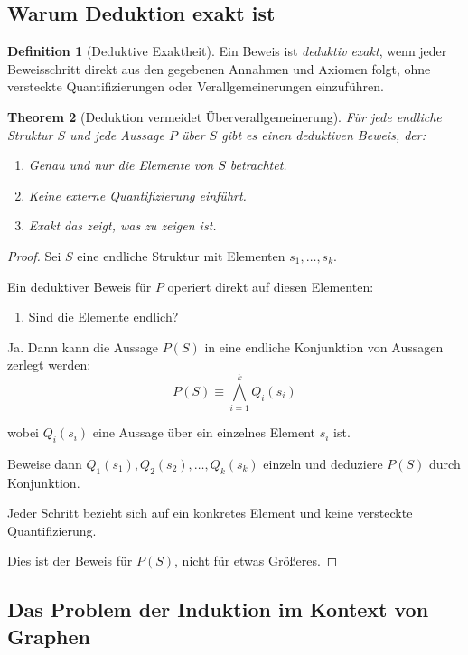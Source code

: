 \documentclass[12pt, a4paper]{article}
\newtheorem{theorem}{Theorem}[section]
\theoremstyle{definition}
\newtheorem{definition}[theorem]{Definition}
\theoremstyle{remark}
\begin{document}
\subsection{Warum Deduktion exakt ist}
\label{subsec:warum_deduktion_exakt}

\begin{definition}[Deduktive Exaktheit]
\label{def:deduktive_exaktheit}
Ein Beweis ist \emph{deduktiv exakt}, wenn jeder Beweisschritt direkt aus den gegebenen Annahmen und Axiomen folgt, ohne versteckte Quantifizierungen oder Verallgemeinerungen einzuführen.
\end{definition}

\begin{theorem}[Deduktion vermeidet Überverallgemeinerung]
\label{thm:deduktion_vermeidet}
Für jede endliche Struktur $S$ und jede Aussage $P$ über $S$ gibt es einen deduktiven Beweis, der:
\begin{enumerate}[label=(\alph*)]
  \item Genau und nur die Elemente von $S$ betrachtet.
  \item Keine externe Quantifizierung einführt.
  \item Exakt das zeigt, was zu zeigen ist.
\end{enumerate}
\end{theorem}

\begin{proof}
Sei $S$ eine endliche Struktur mit Elementen $s_1, \ldots, s_k$.

Ein deduktiver Beweis für $P$ operiert direkt auf diesen Elementen:
\begin{enumerate}[label=(\roman*)]
  \item Sind die Elemente endlich?
\end{enumerate}

Ja. Dann kann die Aussage $P(S)$ in eine endliche Konjunktion von Aussagen zerlegt werden:
\[
  P(S) \equiv \bigwedge_{i=1}^{k} Q_i(s_i)
\]

wobei $Q_i(s_i)$ eine Aussage über ein einzelnes Element $s_i$ ist.

Beweise dann $Q_1(s_1), Q_2(s_2), \ldots, Q_k(s_k)$ einzeln und deduziere $P(S)$ durch Konjunktion.

Jeder Schritt bezieht sich auf ein konkretes Element und keine versteckte Quantifizierung.

Dies ist der Beweis für $P(S)$, nicht für etwas Größeres.
\end{proof}

\subsection{Das Problem der Induktion im Kontext von Graphen}
\label{subsec:induktion_graphen}
\end{document}
